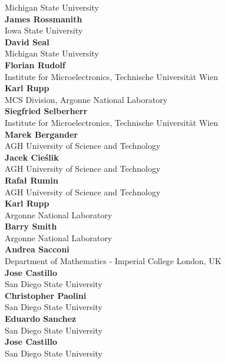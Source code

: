 \documentclass[article,A4,11pt]{llncs}%
\begin{document}
    Michigan State University\\
        \noindent
    {\bf James Rossmanith}\\
    Iowa State University\\
        \noindent
    {\bf David Seal}\\
    Michigan State University\\
        \noindent
    {\bf Florian Rudolf}\\
    Institute for Microelectronics, Technische Universität Wien\\
        \noindent
    {\bf Karl Rupp}\\
    MCS Division, Argonne National Laboratory\\
        \noindent
    {\bf Siegfried Selberherr}\\
    Institute for Microelectronics, Technische Universität Wien\\
        \noindent
    {\bf Marek Bergander}\\
    AGH University of Science and Technology\\
        \noindent
    {\bf Jacek Cieślik}\\
    AGH University of Science and Technology\\
        \noindent
    {\bf Rafał Rumin}\\
    AGH University of Science and Technology\\
        \noindent
    {\bf Karl Rupp}\\
    Argonne National Laboratory\\
        \noindent
    {\bf Barry Smith}\\
    Argonne National Laboratory\\
        \noindent
    {\bf Andrea Sacconi}\\
    Department of Mathematics - Imperial College London, UK\\
        \noindent
    {\bf Jose Castillo}\\
    San Diego State University\\
        \noindent
    {\bf Christopher Paolini}\\
    San Diego State University\\
        \noindent
    {\bf Eduardo Sanchez}\\
    San Diego State University\\
        \noindent
    {\bf Jose Castillo}\\
    San Diego State University\\
        \noindent
\end{document}
